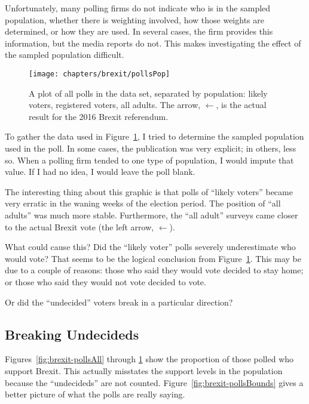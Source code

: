Unfortunately, many polling firms do not indicate who is in the sampled population, whether there is weighting involved, how those weights are determined, or how they are used. In several cases, the firm provides this information, but the media reports do not. This makes investigating the effect of the sampled population difficult.


\begin{figure}\centering
 \texttt{[image: chapters/brexit/pollsPop]}
 \caption[Brexit-2016 polls by population]{A plot of all polls in the data set, separated by population: likely voters, registered voters, all adults. The arrow, $\leftarrow$, is the actual result for the 2016 Brexit referendum.}
 \label{fig:brexit-pollsPop}
\end{figure}


To gather the data used in Figure~\ref{fig:brexit-pollsPop}, I tried to determine the sampled population used in the poll. In some cases, the publication was very explicit; in others, less so. When a polling firm tended to one type of population, I would impute that value. If I had no idea, I would leave the poll blank. 

The interesting thing about this graphic is that polls of ``likely voters'' became very erratic in the waning weeks of the election period. The position of ``all adults'' was much more stable. Furthermore, the ``all adult'' surveys came closer to the actual Brexit vote (the left arrow, $\leftarrow$).

What could cause this? Did the ``likely voter'' polls severely underestimate who would vote? That seems to be the logical conclusion from Figure~\ref{fig:brexit-pollsPop}. This may be due to a couple of reasons: those who said they would vote decided to stay home; or those who said they would not vote decided to vote.

Or did the ``undecided'' voters break in a particular direction?








\subsection{Breaking Undecideds}
Figures~\ref{fig:brexit-pollsAll} through \ref{fig:brexit-pollsPop} show the proportion of those polled who support Brexit. This actually misstates the support levels in the population because the ``undecideds'' are not counted. Figure~\ref{fig:brexit-pollsBounds} gives a better picture of what the polls are really saying. 



